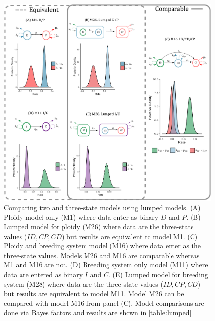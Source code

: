 \begin{figure}
\includegraphics[width=\textwidth]{fig3.pdf} %
\caption{Comparing two and three-state models using lumped models. (A) Ploidy model only (M1) where data enter as binary $D$ and $P$. 
(B) Lumped model for ploidy (M26) where data are the three-state values ($ID,CP,CD$) but results are equivalent to model M1.  
(C) Ploidy and breeding system model (M16) where  data enter as the three-state values. Models M26 and M16 are comparable whereas M1 and M16 are not.
(D) Breeding system only model (M11) where data are entered as binary $I$ and $C$. 
(E) Lumped model for breeding system (M28) where data are the three-state values ($ID,CP,CD$) but results are equivalent to model M11. Model M26 can be compared with model M16 from panel (C).
Model comparisons are done via Bayes factors and results are shown in \cref{table:lumped}}  
\label{figure:lumped}
\end{figure}


